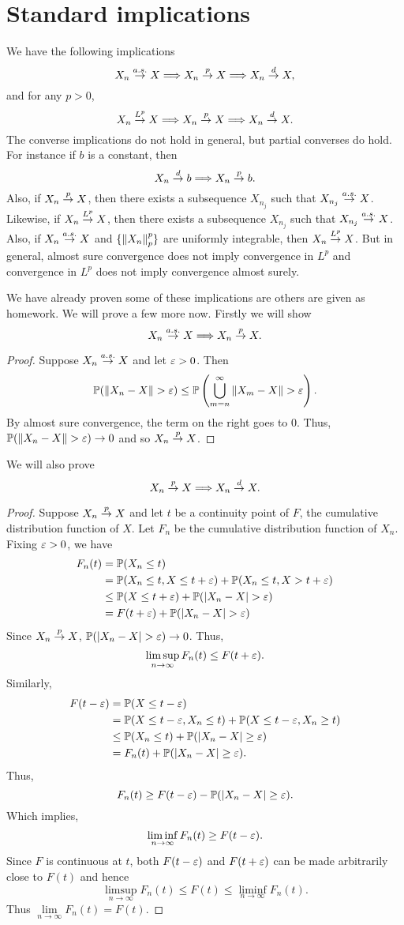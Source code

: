 \section{Standard implications}
We have the following implications
\[X_n \stackrel{a.s.}{\to} X \Longrightarrow X_n \stackrel{p}{\to} X \Longrightarrow X_n \stackrel{d}{\to} X, \]
and for any $p > 0$, 
\[X_n \stackrel{L^{p}}{\to} X \Longrightarrow X_n \stackrel{p}{\to} X \Longrightarrow X_n \stackrel{d}{\to} X.\]
The converse implications do not hold in general, but partial converses do hold. For instance if $b$ is a constant, then
\[ X_n \stackrel{d}{\to} b \Longrightarrow X_n \stackrel{p}{\to} b.\]
Also, if $X_n \stackrel{p}{\to} X$, then there exists a subsequence $X_{n_j}$ such that $X_{n_j} \stackrel{a.s.}{\to} X$. Likewise, if $X_n \stackrel{L^{p}}{\to} X$, then there exists a subsequence $X_{n_j}$ such that $X_{n_j} \stackrel{a.s.}{\to} X$. Also, if $X_n \stackrel{a.s.}{\to} X$ and $\{\left\|X_n\right\|_p^p\}$ are uniformly integrable, then $X_n \stackrel{L^{p}}{\to} X$. But in general, almost sure convergence does not imply convergence in $L^p$ and convergence in $L^p$ does not imply convergence almost surely.

We have already proven some of these implications are others are given as homework. We will prove a few more now. Firstly we will show 
\[ X_n \stackrel{a.s.}{\to} X \Longrightarrow X_n \stackrel{p}{\to} X.\]
\begin{proof}
    Suppose $X_n \stackrel{a.s.}{\to} X$ and let $\varepsilon > 0$. Then 
    \[{\mathbb{P}}(\left\|X_n-X\right\| >\varepsilon) \le {\mathbb{P}}\left(\bigcup_{m=n}^\infty \left\|X_m-X\right\| > \varepsilon\right).\]
    By almost sure convergence, the term on the right goes to 0. Thus, ${\mathbb{P}}(\left\|X_n-X\right\| > \varepsilon) \to 0$ and so $X_n \stackrel{p}{\to} X$.
\end{proof}
We will also prove
\[X_n \stackrel{p}{\to} X \Longrightarrow X_n \stackrel{d}{\to} X. \]
\begin{proof}
    Suppose $X_n \stackrel{p}{\to} X$ and let $t$ be a continuity point of $F$, the cumulative distribution function of $X$. Let $F_n$ be the cumulative distribution function of $X_n$. Fixing $\varepsilon >0$, we have
    \begin{align*}
        F_n(t)&={\mathbb{P}}(X_n \le t)\\
         &= {\mathbb{P}}(X_n \le t, X \le t+\varepsilon) + {\mathbb{P}}(X_n \le t, X > t+\varepsilon)\\
        &\le {\mathbb{P}}(X \le t+\varepsilon) + {\mathbb{P}}({\left\lvert X_n -X\right\rvert}>\varepsilon)\\
        &=F(t+\varepsilon) +{\mathbb{P}}({\left\lvert X_n -X\right\rvert}>\varepsilon)
    \end{align*}
    Since $X_n \stackrel{p}{\to} X$, ${\mathbb{P}}({\left\lvert X_n-X\right\rvert}>\varepsilon) \to 0$. Thus,
    \[ \limsup_{n \to \infty} F_n(t) \le F(t+\varepsilon).\]
    Similarly,
    \begin{align*}
        F(t-\varepsilon) &= {\mathbb{P}}(X \le t-\varepsilon)\\
        &={\mathbb{P}}(X \le t-\varepsilon, X_n \le t)+{\mathbb{P}}(X \le t-\varepsilon, X_n \ge t)\\
        &\le {\mathbb{P}}(X_n \le t) + {\mathbb{P}}({\left\lvert X_n-X\right\rvert}\ge \varepsilon)\\
        &=F_n(t)+{\mathbb{P}}({\left\lvert X_n-X\right\rvert}\ge \varepsilon).
    \end{align*}
    Thus,
    \[F_n(t) \ge F(t-\varepsilon) - {\mathbb{P}}({\left\lvert X_n-X\right\rvert} \ge \varepsilon). \]
    Which implies,
    \[\liminf_{n \to \infty} F_n(t) \ge F(t-\varepsilon). \]
    Since $F$ is continuous at $t$, both $F(t-\varepsilon)$ and $F(t+\varepsilon)$ can be made arbitrarily close to $F(t)$ and hence 
    \[\limsup_{n \to \infty} F_n(t) \le F(t) \le \liminf_{n \to \infty}F_n(t). \]
    Thus $\lim\limits_{n \to \infty} F_n(t) = F(t)$. 
\end{proof}
